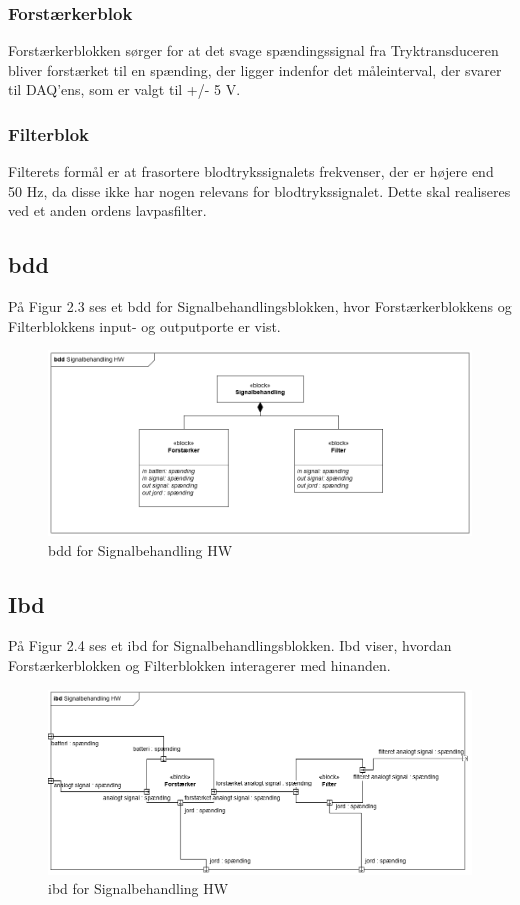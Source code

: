 \subsubsection{Forstærkerblok}
Forstærkerblokken sørger for at det svage spændingssignal fra Tryktransduceren bliver forstærket til en spænding, der ligger indenfor det måleinterval, der svarer til DAQ'ens, som er valgt til +/- 5 V.
 
\subsubsection{Filterblok}
Filterets formål er at frasortere blodtrykssignalets frekvenser, der er højere end 50 Hz, da disse ikke har nogen relevans for blodtrykssignalet. Dette skal realiseres ved et anden ordens lavpasfilter. 
 
\subsection{bdd}
På Figur 2.3 ses et bdd for Signalbehandlingsblokken, hvor Forstærkerblokkens og Filterblokkens input- og outputporte er vist.  
\begin{figure}[H]
	\centering
	\includegraphics[width=1\textwidth]{Figurer/4}
	\caption{bdd for Signalbehandling HW}
	\label{fig:bdd hw}
\end{figure}

\subsection{Ibd}
På Figur 2.4 ses et ibd for Signalbehandlingsblokken. Ibd viser, hvordan Forstærkerblokken og Filterblokken interagerer med hinanden. 

\begin{figure}[H]
	\centering
	\includegraphics[width=1\textwidth]{Figurer/5}
	\caption{ibd for Signalbehandling HW}
	\label{fig:ibd hw}
\end{figure}

